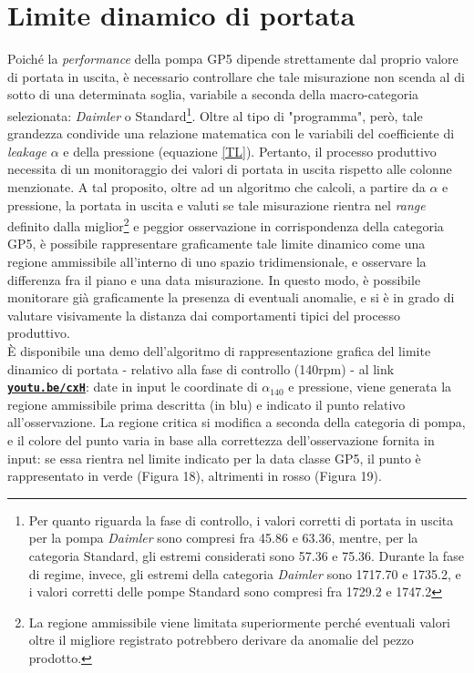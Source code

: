 \documentclass[fleqn,10pt]{SelfArx} %
\begin{document}
\section{Limite dinamico di portata}\label{lim}
Poiché la \textit{performance} della pompa GP5 dipende strettamente dal proprio valore di portata in uscita, è necessario controllare che tale misurazione non scenda al di sotto di una determinata soglia, variabile a seconda della macro-categoria selezionata: \textit{Daimler} o Standard\footnote{Per quanto riguarda la fase di controllo, i valori corretti di portata in uscita per la pompa \textit{Daimler} sono compresi fra 45.86 e 63.36, mentre, per la categoria Standard, gli estremi considerati sono 57.36 e 75.36. Durante la fase di regime, invece, gli estremi della categoria \textit{Daimler} sono 1717.70 e 1735.2, e i valori corretti delle pompe Standard sono compresi fra 1729.2 e 1747.2}. Oltre al tipo di "programma", però, tale grandezza condivide una relazione matematica con le variabili del coefficiente di \textit{leakage} $\alpha$ e della pressione (equazione \ref{TL}). Pertanto, il processo produttivo necessita di un monitoraggio dei valori di portata in uscita rispetto alle colonne menzionate. A tal proposito, oltre ad un algoritmo che calcoli, a partire da $\alpha$ e pressione, la portata in uscita e valuti se tale misurazione rientra nel \textit{range} definito dalla miglior\footnote{La regione ammissibile viene limitata superiormente perché eventuali valori oltre il migliore registrato potrebbero derivare da anomalie del pezzo prodotto.} e peggior osservazione in corrispondenza della categoria GP5, è possibile rappresentare graficamente tale limite dinamico come una regione ammissibile all'interno di uno spazio tridimensionale, e osservare la differenza fra il piano e una data misurazione. In questo modo, è possibile monitorare già graficamente la presenza di eventuali anomalie, e si è in grado di valutare visivamente la distanza dai comportamenti tipici del processo produttivo.\\
È disponibile una demo dell'algoritmo di rappresentazione grafica del limite dinamico di portata - relativo alla fase di controllo (140rpm) - al link \href{https://www.youtube.com/watch?v=cxHw8cPm-Ek}{\textbf{\texttt{youtu.be/cxH}}}: date in input le coordinate di $\alpha_{140}$ e pressione, viene generata la regione ammissibile prima descritta (in blu) e indicato il punto relativo all'osservazione. La regione critica si modifica a seconda della categoria di pompa, e il colore del punto varia in base alla correttezza dell'osservazione fornita in input: se essa rientra nel limite indicato per la data classe GP5, il punto è rappresentato in verde (Figura 18), altrimenti in rosso (Figura 19).
\end{document}
